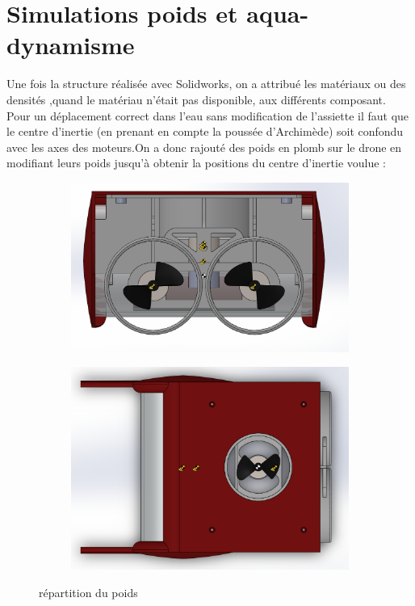 \documentclass[a4paper,11pt]{report}
\begin{document}
			\section{Simulations poids et aqua-dynamisme}
					Une fois la structure réalisée avec Solidworks, on a attribué les matériaux ou des densités ,quand le matériau n'était pas disponible, aux différents composant.\newline
				Pour un déplacement correct dans l'eau sans modification de l'assiette il faut que le centre d'inertie (en prenant en compte la poussée d’Archimède) soit confondu avec les axes des moteurs.On a donc rajouté des poids en plomb sur le drone en modifiant leurs poids jusqu'à obtenir la positions du centre d'inertie voulue : 
					\begin{figure}[!h]
						\centering
							\begin{subfigure}[b]{0.3\textwidth}
								\includegraphics[width=\textwidth]{Photos/Capture20.png}
							\end{subfigure}
							\begin{subfigure}[b]{0.3\textwidth}
								\includegraphics[width=\textwidth]{Photos/Capture21.png}
							\end{subfigure}
							\caption{répartition du poids}
					\end{figure}\newline
					
\end{document}
